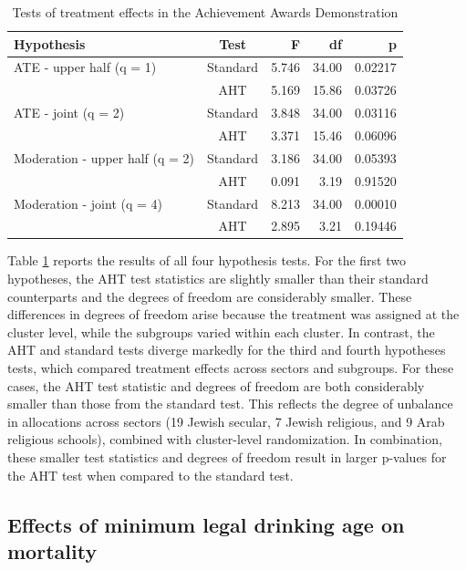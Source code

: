 \documentclass[12pt]{article}\usepackage[]{graphicx}\usepackage[]{color}
\begin{document}
\begin{table}[bth]
\centering
\caption{Tests of treatment effects in the Achievement Awards Demonstration} 
\label{tab:AAD}
\begin{tabular}{lcrrr}
  \toprule
Hypothesis & Test & F & df & p \\ 
  \midrule
ATE - upper half (q = 1) & Standard & 5.746 & 34.00 & 0.02217 \\ 
   & AHT & 5.169 & 15.86 & 0.03726 \\ 
  ATE - joint (q = 2) & Standard & 3.848 & 34.00 & 0.03116 \\ 
   & AHT & 3.371 & 15.46 & 0.06096 \\ 
   \midrule
Moderation - upper half (q = 2) & Standard & 3.186 & 34.00 & 0.05393 \\ 
   & AHT & 0.091 & 3.19 & 0.91520 \\ 
  Moderation - joint (q = 4) & Standard & 8.213 & 34.00 & 0.00010 \\ 
   & AHT & 2.895 & 3.21 & 0.19446 \\ 
   \bottomrule
\end{tabular}
\end{table}


Table \ref{tab:AAD} reports the results of all four hypothesis tests. 
For the first two hypotheses, the AHT test statistics are slightly smaller than their standard counterparts and the degrees of freedom are considerably smaller. 
These differences in degrees of freedom arise because the treatment was assigned at the cluster level, while the subgroups varied within each cluster. 
In contrast, the AHT and standard tests diverge markedly for the third and fourth hypotheses tests, which compared treatment effects across sectors and subgroups.
For these cases, the AHT test statistic and degrees of freedom are both considerably smaller than those from the standard test. 
This reflects the degree of unbalance in allocations across sectors (19 Jewish secular, 7 Jewish religious, and 9 Arab religious schools), combined with cluster-level randomization. 
In combination, these smaller test statistics and degrees of freedom result in larger p-values for the AHT test when compared to the standard test.

\subsection{Effects of minimum legal drinking age on mortality} 
\end{document}
